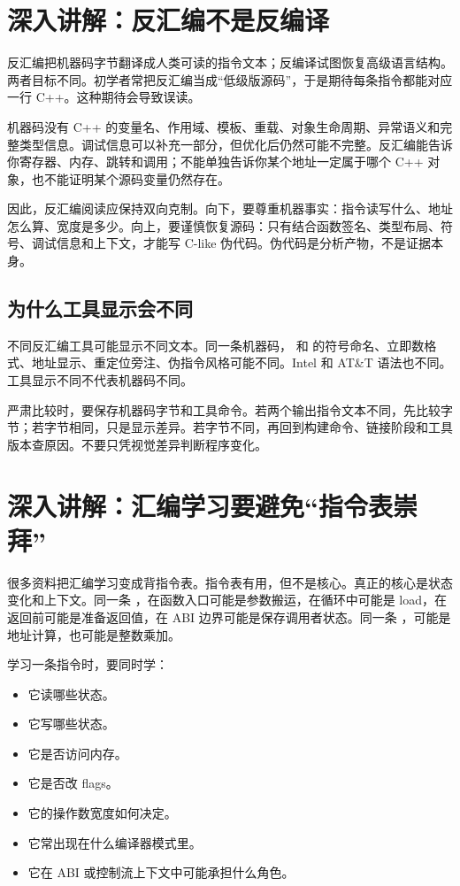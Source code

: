 \section{深入讲解：反汇编不是反编译}

反汇编把机器码字节翻译成人类可读的指令文本；反编译试图恢复高级语言结构。两者目标不同。初学者常把反汇编当成“低级版源码”，于是期待每条指令都能对应一行 C++。这种期待会导致误读。

机器码没有 C++ 的变量名、作用域、模板、重载、对象生命周期、异常语义和完整类型信息。调试信息可以补充一部分，但优化后仍然可能不完整。反汇编能告诉你寄存器、内存、跳转和调用；不能单独告诉你某个地址一定属于哪个 C++ 对象，也不能证明某个源码变量仍然存在。

因此，反汇编阅读应保持双向克制。向下，要尊重机器事实：指令读写什么、地址怎么算、宽度是多少。向上，要谨慎恢复源码：只有结合函数签名、类型布局、符号、调试信息和上下文，才能写 C-like 伪代码。伪代码是分析产物，不是证据本身。

\subsection{为什么工具显示会不同}

不同反汇编工具可能显示不同文本。同一条机器码， 和  的符号命名、立即数格式、地址显示、重定位旁注、伪指令风格可能不同。Intel 和 AT\&T 语法也不同。工具显示不同不代表机器码不同。

严肃比较时，要保存机器码字节和工具命令。若两个输出指令文本不同，先比较字节；若字节相同，只是显示差异。若字节不同，再回到构建命令、链接阶段和工具版本查原因。不要只凭视觉差异判断程序变化。

\section{深入讲解：汇编学习要避免“指令表崇拜”}

很多资料把汇编学习变成背指令表。指令表有用，但不是核心。真正的核心是状态变化和上下文。同一条 ，在函数入口可能是参数搬运，在循环中可能是 load，在返回前可能是准备返回值，在 ABI 边界可能是保存调用者状态。同一条 ，可能是地址计算，也可能是整数乘加。

学习一条指令时，要同时学：

\begin{itemize}
  \item 它读哪些状态。
  \item 它写哪些状态。
  \item 它是否访问内存。
  \item 它是否改 flags。
  \item 它的操作数宽度如何决定。
  \item 它常出现在什么编译器模式里。
  \item 它在 ABI 或控制流上下文中可能承担什么角色。
\end{itemize}

